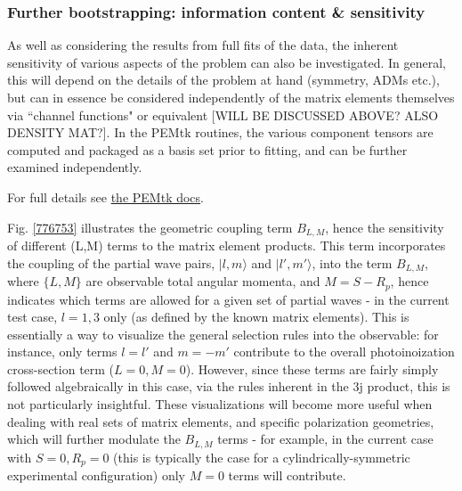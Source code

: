 \subsubsection{Further bootstrapping: information content \& sensitivity}

As well as considering the results from full fits of the data, the inherent sensitivity of various aspects of the problem can also be investigated. In general, this will depend on the details of the problem at hand (symmetry, ADMs etc.), but can in essence be considered independently of the matrix elements themselves via ``channel functions" or equivalent [WILL BE DISCUSSED ABOVE? ALSO DENSITY MAT?]. In the PEMtk routines, the various component tensors are computed and packaged as a basis set prior to fitting, and can be further examined independently. 

For full details see \href{https://pemtk.readthedocs.io/en/latest/fitting/PEMtk_fitting_basis-set_demo_050621-full.html}{the PEMtk docs}.

Fig. \ref{776753} illustrates the geometric coupling term $B_{L,M}$, hence the sensitivity of different (L,M) terms to the matrix element products. This term incorporates the coupling of the partial wave pairs, $|l,m\rangle$ and $|l',m'\rangle$, into the term $B_{L,M}$, where $\{L,M\}$ are observable total angular momenta, and $M = S-R_{p}$, 
hence indicates which terms are allowed for a given set of partial waves - in the current test case, $l=1,3$ only (as defined by the known matrix elements). This is essentially a way to visualize the general selection rules into the observable: for instance, only terms $l=l'$ and $m=-m'$ contribute to the overall photoinoization cross-section term ($L=0, M=0$). However, since these terms are fairly simply followed algebraically in this case, via the rules inherent in the 3j product, this is not particularly insightful. These visualizations will become more useful when dealing with real sets of matrix elements, and specific polarization geometries, which will further modulate the $B_{L,M}$ terms - for example, in the current case with $S=0, R_p=0$ (this is typically the case for a cylindrically-symmetric experimental configuration) only $M=0$ terms will contribute.

